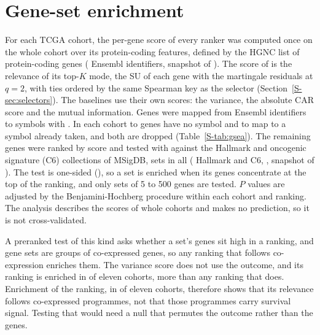 \begin{table}[htbp]
\centering\footnotesize
\caption{Selection stability at ten genes by the similarity threshold $\theta$ of the
index, as means over the eleven TCGA cohorts on the published split. At $\theta = 0.5$ the
correction for chance uses \SuppThetaDrawsLow{} draws instead of \SuppThetaDraws, so those
values are approximate.}
\label{S-tab:theta}

\end{table}

\section{Gene-set enrichment}\label{S-sec:gsea}

For each TCGA cohort, the per-gene score of every ranker was computed once on the whole
cohort over its protein-coding features, defined by the HGNC list of protein-coding genes
\citep{seal2023} (\SuppCodingIds{} Ensembl identifiers, snapshot of \SuppCodingDate). The
score of  is the relevance of its top-$K$ mode, the SU of each gene with
the martingale residuals at $q = 2$, with ties ordered by the same Spearman key as the
selector (Section~\ref{S-sec:selectors}). The baselines use their own scores: the
variance, the absolute CAR score and the mutual information. Genes were mapped from
Ensembl identifiers to symbols with . In each cohort
\SuppNoSymbolMin{} to \SuppNoSymbolMax{} genes have no symbol and \SuppDupMin{} to
\SuppDupMax{} map to a symbol already taken, and both are dropped
(Table~\ref{S-tab:gsea}). The remaining genes were ranked by score and tested with
 \citep{korotkevich2016}
against the Hallmark \citep{liberzon2015} and oncogenic signature (C6)
\citep{liberzon2011} collections of MSigDB, \SuppSetsTotal{} sets in all
(\SuppSetsHallmark{} Hallmark and \SuppSetsCsix{} C6,  \SuppMsigdbrVersion,
snapshot of \SuppMsigdbDate). The test is one-sided (), so a set
is enriched when its genes concentrate at the top of the ranking, and only sets of 5 to
500 genes are tested. $P$ values are adjusted by the Benjamini-Hochberg procedure within
each cohort and ranking. The analysis describes the scores of whole cohorts and makes no
prediction, so it is not cross-validated.

A preranked test of this kind asks whether a set's genes sit high in a ranking, and gene
sets are groups of co-expressed genes, so any ranking that follows co-expression enriches
them. The variance score does not use the outcome, and its ranking is enriched in
\SuppGseaVariance{} of eleven cohorts, more than any ranking that does. Enrichment of the
 ranking, in \SuppGseaSurvfcbf{} of eleven cohorts, therefore shows that its
relevance follows co-expressed programmes, not that those programmes carry survival
signal. Testing that would need a null that permutes the outcome rather than the genes.


